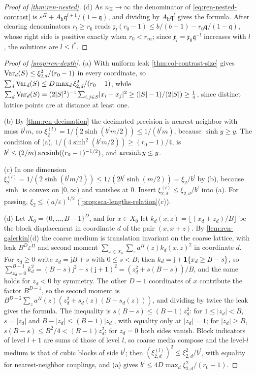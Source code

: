 \begin{proof}[Proof of \cref{thm:ren-nested}]
(d) As $n_{\mathrm H}\to\infty$ the denominator of \eqref{eq:ren-nested-contrast} is $\varepsilon^\Pi+A_{\mathrm h}\mathfrak q^{l+1}/(1-\mathfrak q)$, and dividing by $A_{\mathrm h}\mathfrak q^l$ gives the formula. After clearing denominators $r_l\ge r_0$ reads $\mathfrak x_l(r_0-1)\le b/(b-1)-r_0\mathfrak q/(1-\mathfrak q)$, whose right side is positive exactly when $r_0<r_\infty$; since $\mathfrak x_l=\mathfrak x_0\mathfrak q^{-l}$ increases with $l$, the solutions are $l\le l^\ast$.
\end{proof}

\begin{proof}[Proof of \cref{prop:ren-depth}]
(a) With uniform leak \cref{thm:col-contrast-size} gives $\operatorname{Var}_d(S)\le\xi^2_{2,d}/(r_0-1)$ in every coordinate, so $\sum_d\operatorname{Var}_d(S)\le D\max_d\xi^2_{2,d}/(r_0-1)$, while $\sum_d\operatorname{Var}_d(S)=(2\lvert S\rvert^2)^{-1}\sum_{i,j\in S}\lvert x_i-x_j\rvert^2\ge(\lvert S\rvert-1)/(2\lvert S\rvert)\ge\frac14$, since distinct lattice points are at distance at least one.

(b) By \cref{thm:ren-decimation} the decimated precision is nearest-neighbor with mass $b^lm$, so $\xi^{(l)}_2=1/(2\sinh(b^lm/2))\le1/(b^lm)$, because $\sinh y\ge y$. The condition of (a), $1/(4\sinh^2(b^lm/2))\ge(r_0-1)/4$, is $b^l\le(2/m)\operatorname{arcsinh}((r_0-1)^{-1/2})$, and $\operatorname{arcsinh} y\le y$.

(c) In one dimension $\xi^{(l)}_2=1/(2\sinh(b^lm/2))\le1/(2b^l\sinh(m/2))=\xi_2/b^l$ by (b), because $\sinh$ is convex on $[0,\infty)$ and vanishes at $0$. Insert $\xi^{(l)}_{2,d}\le\xi_{2,d}/b^l$ into (a). For passing, $\xi_2\le(a/\varepsilon)^{1/2}$ (\cref{prop:sca-lengths-relation}(c)).

(d) Let $X_0=\{0,\dots,B-1\}^D$, and for $x\in X_0$ let $k_d(x,z)=\lfloor(x_d+z_d)/B\rfloor$ be the block displacement in coordinate $d$ of the pair $(x,x+z)$. By \cref{lem:ren-galerkin}(d) the coarse medium is translation invariant on the coarse lattice, with leak $B^D\varepsilon^\Pi$ and second moment $\sum_{x\in X_0}\sum_za^\Pi(z)k_d(x,z)^2$ in coordinate $d$. For $z_d\ge0$ write $z_d=\mathsf jB+s$ with $0\le s<B$; then $k_d=\mathsf j+\mathbf{1}\{x_d\ge B-s\}$, so $\sum_{x_d=0}^{B-1}k_d^2=(B-s)\mathsf j^2+s(\mathsf j+1)^2=(z_d^2+s(B-s))/B$, and the same holds for $z_d<0$ by symmetry. The other $D-1$ coordinates of $x$ contribute the factor $B^{D-1}$, so the second moment is $B^{D-2}\sum_za^\Pi(z)(z_d^2+s_d(z)(B-s_d(z)))$, and dividing by twice the leak gives the formula. The inequality is $s(B-s)\le(B-1)z_d^2$: for $1\le\lvert z_d\rvert<B$, $s=\lvert z_d\rvert$ and $B-\lvert z_d\rvert\le(B-1)\lvert z_d\rvert$, with equality only at $\lvert z_d\rvert=1$; for $\lvert z_d\rvert\ge B$, $s(B-s)\le B^2/4<(B-1)z_d^2$; for $z_d=0$ both sides vanish. Block indicators of level $l+1$ are sums of those of level $l$, so coarse media compose and the level-$l$ medium is that of cubic blocks of side $b^l$; then $(\xi^{(l)}_{2,d})^2\le\xi^2_{2,d}/b^l$, with equality for nearest-neighbor couplings, and (a) gives $b^l\le4D\max_d\xi^2_{2,d}/(r_0-1)$.
\end{proof}

